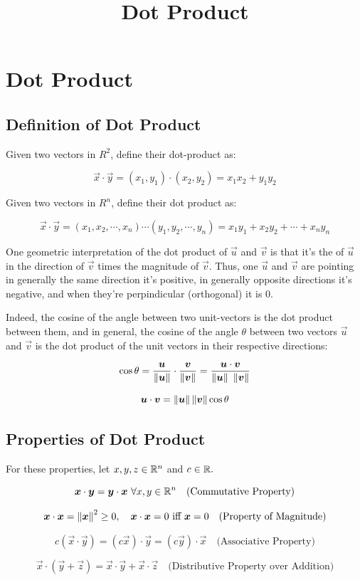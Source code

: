 \documentclass{article}
\title{Dot Product}
\begin{document}
\section{Dot Product}

\subsection{Definition of Dot Product}

Given two \@{vectors} in $R^2$, define their \@{dot-product} as:

\[ \vec{x} \cdot \vec{y} = (x_1, y_1) \cdot (x_2, y_2) = x_1 x_2 + y_1 y_2 \]

Given two vectors in $R^n$, define their dot product as:

\[ \vec{x} \cdot \vec{y} = (x_1, x_2, \cdots, x_n) \cdots (y_1, y_2, \cdots, y_n)  = x_1 y_1 + x_2 y_2 + \cdots + x_n y_n \]

One geometric interpretation of the dot product of $\vec{u}$ and $\vec{v}$ is that it's the  of $\vec{u}$ in the \@{direction} of $\vec{v}$ times the \@{magnitude} of $\vec{v}$. Thus, one $\vec{u}$ and $\vec{v}$ are pointing in generally the same direction it's positive, in generally opposite directions it's negative, and when they're perpindicular (\@{orthogonal}) it is $0$.

Indeed, the cosine of the angle between two \@{unit-vectors} is the dot product between them, and in general, the cosine of the angle $\theta$ between two vectors $\vec{u}$ and $\vec{v}$ is the dot product of the unit vectors in their respective directions:

\[ \cos{\theta} =  \frac{\boldsymbol{u}}{\left\lVert \boldsymbol{u} \right\rVert} \cdot \frac{\boldsymbol{v}}{\left\lVert \boldsymbol{v} \right\rVert} = \frac{\boldsymbol{u} \cdot \boldsymbol{v}}{\left\lVert \boldsymbol{u} \right\rVert ~ \left\lVert \boldsymbol{v} \right\rVert} \] 

\[ \boldsymbol{u} \cdot \boldsymbol{v} = \left\lVert \boldsymbol{u} \right\rVert \left\lVert \boldsymbol{v} \right\rVert \cos{\theta} \]

\subsection{Properties of Dot Product}

For these properties, let $x, y, z \in \mathbb{R}^n$ and $c \in \mathbb{R}.$

\[ \boldsymbol{x} \cdot \boldsymbol{y} = \boldsymbol{y} \cdot \boldsymbol{x} ~ \forall x, y \in \mathbb{R}^n \quad \text{(Commutative Property)} \]

\[ \boldsymbol{x} \cdot \boldsymbol{x} = {\left\lVert \boldsymbol{x} \right\rVert}^2 \geq 0, \quad \boldsymbol{x} \cdot \boldsymbol{x} = 0 ~ \text{iff} ~ \boldsymbol{x} = 0 \quad \text{(Property of Magnitude)} \] 

\[ c(\vec{x} \cdot \vec{y}) = (c\vec{x}) \cdot \vec{y} = (c\vec{y}) \cdot \vec{x}  \quad \text{(Associative Property)} \]

\[ \vec{x} \cdot (\vec{y} + \vec{z}) = \vec{x} \cdot \vec{y} + \vec{x} \cdot \vec{z} \quad \text{(Distributive Property over Addition)} \]
\end{document}
